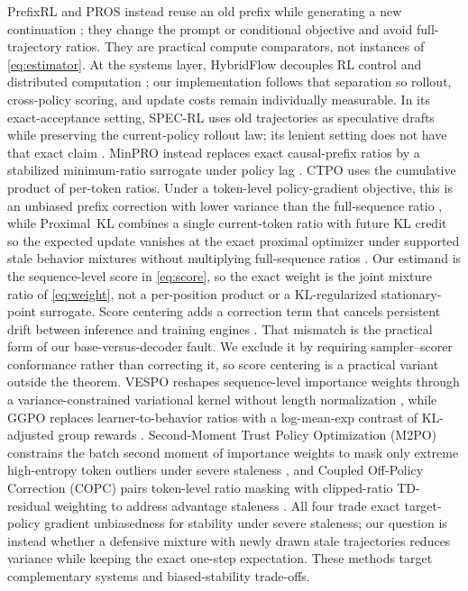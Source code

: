 \documentclass{article}
\begin{document}
PrefixRL and PROS instead reuse an old prefix while generating a new
continuation \cite{setlur2026prefixrl,huang2026pros}; they change the prompt or
conditional objective and avoid full-trajectory ratios. They are practical
compute comparators, not instances of \cref{eq:estimator}. At the systems
layer, HybridFlow decouples RL control and distributed computation
\cite{sheng2025hybridflow}; our implementation follows that separation so
rollout, cross-policy scoring, and update costs remain individually measurable.
In its exact-acceptance setting, SPEC-RL uses old trajectories as speculative
drafts while preserving the current-policy rollout law; its lenient setting
does not have that exact claim \cite{liu2025specrl}. MinPRO instead replaces exact causal-prefix ratios by a
stabilized minimum-ratio surrogate under policy lag \cite{lei2026minpro}.
CTPO uses the cumulative product of per-token ratios. Under a token-level
policy-gradient objective, this is an unbiased prefix correction with lower
variance than the full-sequence ratio \cite{zhang2026ctpo}, while Proximal~KL
combines a single current-token ratio with future KL credit so the expected
update vanishes at the exact proximal optimizer under supported stale behavior
mixtures without multiplying full-sequence ratios \cite{bai2026proximalkl}. Our estimand is the
sequence-level score in \cref{eq:score}, so the exact weight is the joint
mixture ratio of \cref{eq:weight}, not a per-position product or a
KL-regularized stationary-point surrogate.
Score centering adds a correction term that cancels persistent drift between
inference and training engines \cite{marek2026centering}. That mismatch is the
practical form of our base-versus-decoder fault. We exclude it by requiring
sampler--scorer conformance rather than correcting it, so score centering is
a practical variant outside the theorem.
VESPO reshapes sequence-level importance weights through a variance-constrained
variational kernel without length normalization \cite{shen2026vespo}, while
GGPO replaces learner-to-behavior ratios with a log-mean-exp contrast of
KL-adjusted group rewards \cite{zhang2026ggpo}. Second-Moment Trust Policy
Optimization (M2PO) constrains the batch second moment of importance weights to
mask only extreme high-entropy token outliers under severe staleness
\cite{zheng2026m2po}, and Coupled Off-Policy Correction (COPC) pairs token-level
ratio masking with clipped-ratio TD-residual weighting to address advantage
staleness \cite{hu2026copc}. All four trade exact target-policy
gradient unbiasedness for stability under severe staleness; our question is
instead whether a defensive mixture with newly drawn stale trajectories reduces
variance while keeping the exact one-step expectation.
These methods target complementary systems and biased-stability trade-offs.
\end{document}
